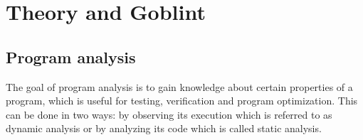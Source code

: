 


\chapter{Theory and Goblint}
\section{Program analysis}
The goal of program analysis is to gain knowledge about certain properties of a program, which is useful for testing, verification and program optimization.
This can be done in two ways: by observing its execution which is referred to as dynamic analysis or by analyzing its code which is called static analysis.

